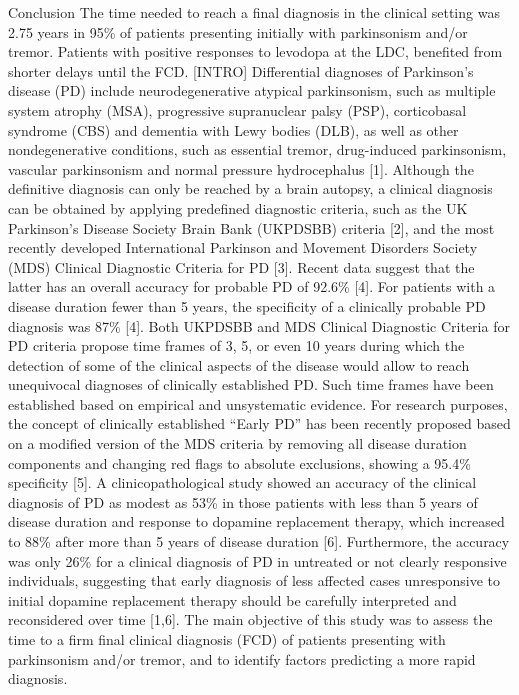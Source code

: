 Conclusion
The time needed to reach a final diagnosis in the clinical setting was 2.75 years in 95\% of patients presenting
initially with parkinsonism and/or tremor. Patients with positive responses to levodopa at the LDC, benefited from
shorter delays until the FCD.
[INTRO]
Differential diagnoses of Parkinson’s disease (PD) include neurodegenerative atypical parkinsonism, such as multiple system atrophy (MSA), progressive supranuclear palsy (PSP), corticobasal syndrome (CBS) and dementia with Lewy bodies (DLB), as well as other nondegenerative conditions, such as essential tremor, drug-induced parkinsonism, vascular parkinsonism and normal pressure hydrocephalus [1]. Although the definitive diagnosis can only be reached by a brain autopsy, a clinical diagnosis can be obtained by applying predefined diagnostic criteria, such as the UK Parkinson’s Disease Society Brain Bank (UKPDSBB) criteria [2], and the most recently developed International Parkinson and Movement Disorders Society (MDS) Clinical Diagnostic Criteria for PD [3]. Recent data suggest that the latter has an overall accuracy for probable PD of 92.6\% [4]. For patients with a disease duration fewer than 5 years, the specificity of a clinically probable PD diagnosis was 87\% [4]. Both UKPDSBB and MDS Clinical Diagnostic Criteria for PD criteria propose time frames of 3, 5, or even 10 years during which the detection of some of the clinical aspects of the disease would allow to reach unequivocal diagnoses of clinically established PD. Such time frames have been established based on empirical and unsystematic evidence. For research purposes, the concept of clinically established “Early PD” has been recently proposed based on a modified version of the MDS criteria by removing all disease duration components and changing red flags to absolute exclusions, showing a 95.4\% specificity [5]. A  clinicopathological study showed an accuracy of the clinical diagnosis of PD as modest as 53\% in those patients with less than 5 years of disease duration and response to dopamine replacement therapy, which increased to 88\% after more than 5 years of disease duration [6]. Furthermore, the accuracy was only 26\% for a clinical diagnosis of PD in untreated or not clearly responsive individuals, suggesting that early diagnosis of less affected cases unresponsive to initial dopamine replacement therapy should be carefully interpreted and reconsidered over time [1,6]. The main objective of this study was to assess the time to a firm final clinical diagnosis (FCD) of patients presenting with parkinsonism and/or tremor, and to identify factors predicting a more rapid diagnosis.


